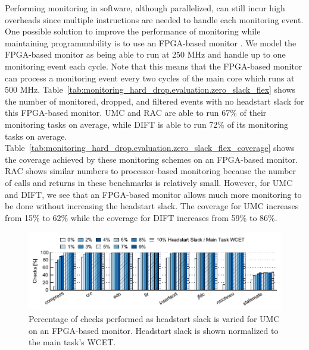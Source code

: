 Performing monitoring in software, although parallelized, can still incur high
overheads since multiple instructions are needed to handle each monitoring
event. One possible solution to improve the performance of monitoring while
maintaining programmability is to use an FPGA-based monitor
\cite{flexcore-micro10}. We model the FPGA-based monitor as being able to
run at 250 MHz and handle up to one monitoring event each cycle. Note that this
means that the FPGA-based monitor can process a monitoring event every two
cycles of the main core which runs at 500 MHz.
Table~\ref{tab:monitoring_hard_drop.evaluation.zero_slack_flex} shows the
number of monitored, dropped, and filtered events with no headstart slack for
this FPGA-based monitor. UMC and RAC are able to run 67\% of their monitoring
tasks on average, while DIFT is able to run 72\% of its monitoring tasks on
average.
Table~\ref{tab:monitoring_hard_drop.evaluation.zero_slack_flex_coverage} shows
the coverage achieved by these monitoring schemes on an FPGA-based monitor. RAC
shows similar numbers to processor-based monitoring because the number of calls
and returns in these benchmarks is relatively small. However, for UMC and DIFT,
we see that an FPGA-based monitor allows much more monitoring to be done
without increasing the headstart slack. The coverage for UMC increases from
15\% to 62\% while the coverage for DIFT increases from 59\% to 86\%.

\begin{figure}
  \begin{center}
    \includegraphics{monitoring_hard_drop/data/flex_umc_sweep.pdf}
    \caption{Percentage of checks performed as headstart slack is varied for
    UMC on an FPGA-based monitor. Headstart slack is shown normalized to the
    main task's WCET.}
    \label{fig:monitoring_hard_drop.evaluation.flex_umc_sweep}
  \end{center}
\end{figure}

